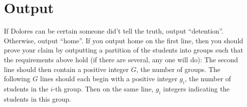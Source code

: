 
\section*{Output}
If Dolores can be certain someone did't tell the truth, output ``detention''. Otherwise, output ``home''. If you output home on the first line, then you should prove your claim by outputting a partition of the students into groups such that the requirements above hold (if there are several, any one will do): The second line should then contain a positive integer $G$, the number of groups. The following $G$ lines should each begin with a positive integer $g_i$, the number of students in the $i$-th group. Then on the same line, $g_i$ integers indicating the students in this group.

